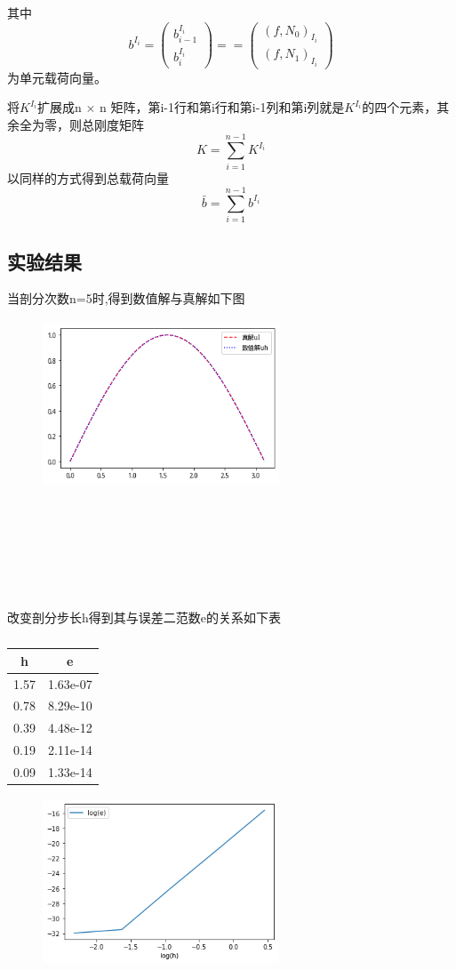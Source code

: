 \documentclass[UTF8,titlepage,twocolumn]{ctexart}
\begin{document}
其中
$$
	b^{I_i} = \begin{pmatrix}
				b_{i-1}^{I_i} \\
				b_i^{I_i}
			  \end{pmatrix} ==
		      \begin{pmatrix}
		      	(f,N_0)_{I_i} \\
		      	(f,N_1)_{I_i}
		      \end{pmatrix}
$$
为单元载荷向量。
\\ \par 
将$K^{I_i}$扩展成n $\times$ n 矩阵，第i-1行和第i行和第i-1列和第i列就是$K^{I_i}$的四个元素，其余全为零，则总刚度矩阵 
$$ 
	K = \sum_{i=1}^{n-1} K^{I_i}
$$
以同样的方式得到总载荷向量
$$
	\bar{b} = \sum_{i=1}^{n-1} b^{I_i}
$$

\subsection{实验结果}

当剖分次数n=5时,得到数值解与真解如下图
\begin{figure}[hb]
	\centering
	\includegraphics[height=5cm,width=7cm]{../image/Poisson1d.png}
	\caption{}
	\label{SampleOfDatasets}
\end{figure}
\\ \\ \\ \\ \\ \\
改变剖分步长h得到其与误差二范数e的关系如下表

\begin{table}[!ht]
	\centering
	\caption{}%
	\begin{tabular}{|c|c|} \hline
		h & e \\ \hline
		1.57 & 1.63e-07 \\ \hline
		0.78 & 8.29e-10 \\ \hline
		0.39 & 4.48e-12 \\ \hline
		0.19 & 2.11e-14 \\ \hline
		0.09 & 1.33e-14 \\ \hline
	\end{tabular}
\end{table}

\begin{figure}[hb]
	\centering
	\includegraphics[height=5cm,width=7cm]{../image/Poisson1d_误差_步长.png}
	\caption{}
\end{figure}
\end{document}

